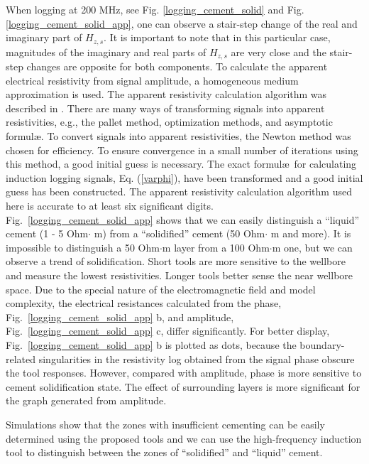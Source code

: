 \documentclass[10pt,twoside]{article}
\begin{document}
When logging at 200 MHz, see Fig. \ref{logging_cement_solid} and Fig. \ref{logging_cement_solid_app}, one can observe a stair-step change of the real and imaginary part of $H_{z,s}$. It is important to note that in this particular case, magnitudes of the imaginary and real parts of $H_{z,s}$ are very close and the stair-step changes are opposite for both components. To calculate the apparent electrical resistivity from signal amplitude, a homogeneous medium approximation is used. The apparent resistivity calculation algorithm was described in \citep{Eltsov2013}. {There are many ways of transforming signals into apparent resistivities, e.g., the pallet method, optimization methods, and asymptotic formul\ae. To convert signals into apparent resistivities, the Newton method was chosen for efficiency. To ensure convergence in a small number of iterations using this method, a good initial guess is necessary. The exact formul\ae~for calculating induction logging signals, Eq. (\ref{varphi}), have been transformed and a good initial guess has been constructed. The apparent resistivity calculation algorithm used here is accurate to at least six significant digits.}  Fig.~\ref{logging_cement_solid_app} shows that we can easily distinguish a ``liquid'' cement (1 - 5 Ohm$\cdot$ m) from a ``solidified'' cement (50 Ohm$\cdot$ m and more). It is impossible to distinguish a 50 Ohm$\cdot$m layer from a 100 Ohm$\cdot$m one, but we can observe a trend of solidification. Short tools are more sensitive to the wellbore and measure the lowest resistivities. Longer tools better sense the near wellbore space. Due to the special nature of the electromagnetic field and model complexity, the electrical resistances calculated from the phase, Fig.~\ref{logging_cement_solid_app} b, and amplitude, Fig.~\ref{logging_cement_solid_app} c, differ significantly. For better display, Fig.~\ref{logging_cement_solid_app} b is plotted as dots, because the boundary-related singularities in the resistivity log obtained from the signal phase obscure the tool responses. However, compared with amplitude, phase is more sensitive to cement solidification state. The effect of surrounding layers is more significant for the graph generated from amplitude.

Simulations show that the zones with insufficient cementing can be easily determined using the proposed tools and we can use the high-frequency induction tool to distinguish between the zones of ``solidified'' and ``liquid'' cement.
\end{document}
